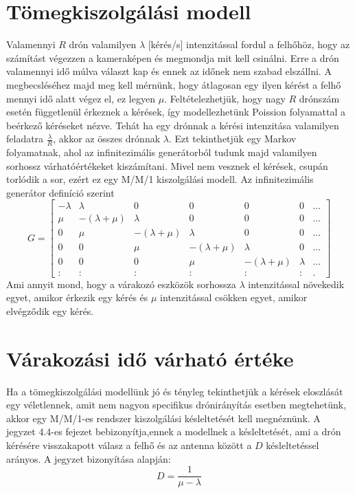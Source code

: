 \section{Tömegkiszolgálási modell}
Valamennyi $R$ drón valamilyen $\lambda$ [kérés/s] intenzitással fordul a felhőhöz, hogy az számítást végezzen a kameraképen és megmondja mit kell csinálni. Erre a drón valamennyi idő múlva választ kap és ennek az időnek nem szabad elszállni. A megbecsléséhez majd meg kell mérnünk, hogy átlagosan egy ilyen kérést a felhő mennyi idő alatt végez el, ez legyen $\mu$.
Feltételezhetjük, hogy nagy $R$ drónszám esetén függetlenül érkeznek a kérések, így modellezhetünk Poission folyamattal a beérkező kéréseket nézve. Tehát ha egy drónnak a kérési intenzitása valamilyen feladatra $\frac{\lambda}{R}$, akkor az összes drónnak $\lambda$.
Ezt tekinthetjük egy Markov folyamatnak, ahol az infinitezimális generátorból tudunk majd valamilyen sorhossz várhatóértékeket kiszámítani. Mivel nem vesznek el kérések, csupán torlódik a sor, ezért ez egy M/M/1 kiszolgálási modell. \cite{toki}
Az infinitezimális generátor definíció szerint
\[ G =
\begin{bmatrix}
-\lambda & \lambda & 0 & 0 & 0 & 0 & ... \\
\mu & -(\lambda+\mu) & \lambda & 0 & 0 & 0 & ... \\
0 & \mu & -(\lambda+\mu) & \lambda & 0 & 0 & ... \\
0 & 0 & \mu & -(\lambda+\mu) & \lambda & 0 & ... \\
0 & 0 & 0 & \mu & -(\lambda+\mu) & \lambda & ... \\
: & : & : & : & : & : & .
\end{bmatrix}
\]
Ami annyit mond, hogy a várakozó eszközök sorhossza $\lambda$ intenzitással növekedik egyet, amikor érkezik egy kérés és $\mu$ intenzitással csökken egyet, amikor elvégződik egy kérés.

\section{Várakozási idő várható értéke}
Ha a tömegkiszolgálási modellünk jó és tényleg tekinthetjük a kérések eloszlását egy véletlennek, amit nem nagyon specifikus drónirányítás esetben megtehetünk, akkor egy M/M/1-es rendszer kiszolgálási késleltetését kell megnéznünk. A \cite{toki} jegyzet 4.4-es fejezet bebizonyítja,ennek a modellnek a késleltetését, ami a drón kérésére visszakapott válasz a felhő és az antenna között a $D$ késleltetéssel arányos. A jegyzet bizonyítása alapján: \[ D = \frac{1}{\mu - \lambda} \]

